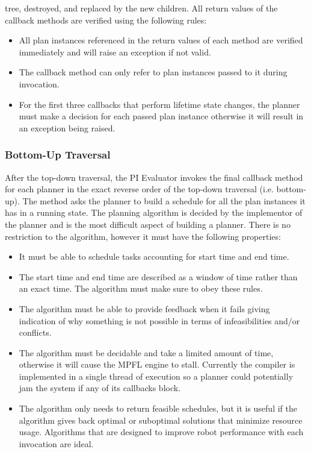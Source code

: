 tree, destroyed, and replaced by the new children. All return values of the callback methods are verified using the following rules:
\begin{itemize}
\item All plan instances referenced in the return values of each method are verified immediately and will raise an exception if not valid.
\item The callback method can only refer to plan instances passed to it during invocation.
\item For the first three callbacks that perform lifetime state changes, the planner must make a decision for each passed plan instance otherwise it will result in an exception being raised.
\end{itemize}

\subsubsection{Bottom-Up Traversal}
After the top-down traversal, the PI Evaluator invokes the final callback method for each planner in the exact reverse order of the top-down traversal (i.e. bottom-up). The method  asks the planner to build a schedule for all the plan instances it has in a running state. The planning algorithm is decided by the implementor of the planner and is the most difficult aspect of building a planner. There is no restriction to the algorithm, however it must have the following properties:
\begin{itemize}
\item It must be able to schedule tasks accounting for start time and end time.
\item The start time and end time are described as a window of time rather than an exact time. The algorithm must make sure to obey these rules.
\item The algorithm must be able to provide feedback when it fails giving indication of why something is not possible in terms of infeasibilities and/or conflicts.
\item The algorithm must be decidable and take a limited amount of time, otherwise it will cause the MPFL engine to stall. Currently the compiler is implemented in a single thread of execution so a planner could potentially jam the system if any of its callbacks block.
\item The algorithm only needs to return feasible schedules, but it is useful if the algorithm gives back optimal or suboptimal solutions that minimize resource usage. Algorithms that are designed to improve robot performance with each  invocation are ideal.
\end{itemize}

